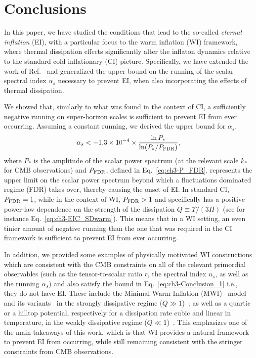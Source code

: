\section{Conclusions}
\label{sec:ch3-conclusions}

In this paper, we have studied  the conditions that lead to the
so-called \textit{eternal inflation} (EI), with a particular focus to the
warm inflation (WI) framework, where thermal dissipation effects
significantly alter the inflaton dynamics relative to the standard
cold inflationary (CI) picture. Specifically, we have extended the work of
Ref.~\cite{Kinney:2014jya} and generalized the upper bound on the running of
the scalar spectral index $\alpha_s$ necessary to prevent EI, when also incorporating the effects of thermal dissipation.

We showed that, similarly to what was found in the context of CI, a
sufficiently negative running  on super-horizon scales is sufficient
to prevent EI from ever occurring.  Assuming a constant running, we
derived the upper bound for $\alpha_s$,
%
\begin{eqnarray}
    \alpha_s<- 1.3\times 10^{-4} \times \frac{\ln P_{*}}{
      \ln(P_{*}/P_{\rm{FDR}})}, \label{eq:ch3-Conclusion_1}
\end{eqnarray}
where $P_*$ is the amplitude of the scalar power spectrum (at the
relevant scale $k_*$ for CMB observations) and $P_{\rm{FDR}}$, defined in Eq.~\ref{eq:ch3-P_FDR}, represents the upper limit on the scalar power spectrum beyond which a
fluctuations dominated regime (FDR) takes over, thereby causing the
onset of EI. In standard CI, $P_{\rm{FDR}}=1$, while in the context of
WI, $P_{\rm{FDR}}>1$ and specifically has a positive power-law
dependence on the strength of the dissipation $Q\equiv \Upsilon/(3H)$
(see for instance Eq.~\ref{eq:ch3-EIC_SDwarm}). This means that in a WI setting, an even tinier amount of
negative running than the one that was required in the CI framework is sufficient to prevent EI from ever occurring.

In addition, we provided some examples of physically motivated WI
constructions which are consistent with the CMB constraints on all of
the relevant primordial observables (such as the tensor-to-scalar
ratio $r$, the spectral index $n_s$, as well as the running
$\alpha_s$) and also satisfy the bound in
Eq.~\ref{eq:ch3-Conclusion_1} i.e., they do not have EI. These include the Minimal Warm Inflation (MWI)~\cite{Berghaus:2019whh} model and its variants~\cite{Das:2020xmh} in the strongly dissipative regime ($Q\gg 1$)~\cite{Das:2022ubr}; as well as a quartic or a
hilltop potential, respectively for a dissipation rate cubic and linear in temperature, in the weakly dissipative regime ($Q\ll 1$)~\cite{Benetti:2016jhf}. This emphasizes one of the main takeaways
of this work, which is that WI provides a natural framework to prevent
EI from occurring, while still remaining consistent with the stringer
constraints from CMB observations.


